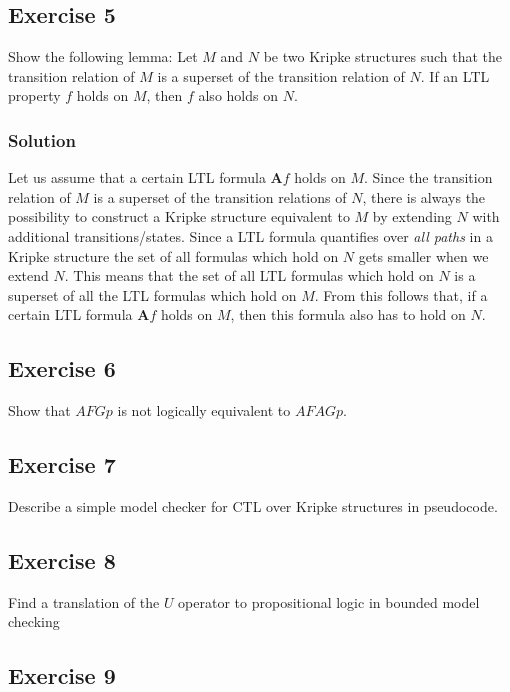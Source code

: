 \documentclass[a4paper, 12pt]{article}
\begin{document}
\subsection{Exercise 5}

Show the following lemma: Let $M$ and $N$ be two Kripke structures such that
the transition relation of $M$ is a superset of the transition relation of
$N$. If an LTL property $f$ holds on $M$, then $f$ also holds on $N$.

\subsubsection{Solution}

Let us assume that a certain LTL formula $\mathbf{A}f$ holds on $M$. Since the
transition relation of $M$ is a superset of the transition relations of $N$,
there is always the possibility to construct a Kripke structure equivalent to
$M$ by extending $N$ with additional transitions/states. Since a LTL formula
quantifies over \emph{all paths} in a Kripke structure the set of all formulas
which hold on $N$ gets smaller when we extend $N$. This means that the set of
all LTL formulas which hold on $N$ is a superset of all the LTL formulas which
hold on $M$. From this follows that, if a certain LTL formula $\mathbf{A}f$
holds on $M$, then this formula also has to hold on $N$.

\subsection{Exercise 6}

Show that $AFG p$ is not logically equivalent to $AFAG p$.

\subsection{Exercise 7}

Describe a simple model checker for CTL over Kripke structures in pseudocode.

\subsection{Exercise 8}

Find a translation of the $U$ operator to propositional logic in bounded model
checking
\subsection{Exercise 9}
\end{document}
